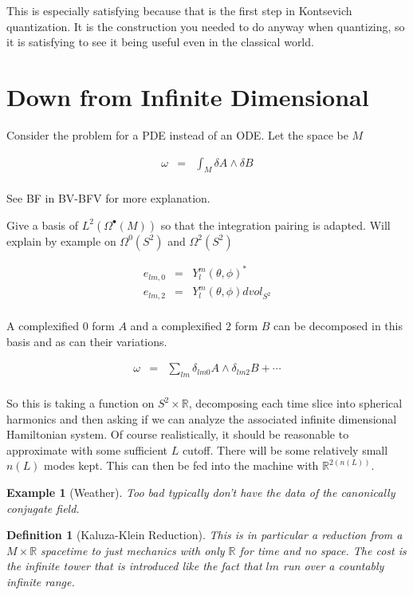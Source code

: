 \documentclass[a4paper,landscape]{article}
\theoremstyle{change}
\newtheorem{definition}[equation]{Definition}
\newtheorem{example}[equation]{Example}
\theoremstyle{nonumberplain}
\numberwithin{equation}{section}
\begin{document}
This is especially satisfying because that is the first step in Kontsevich quantization. It is the construction you needed to do anyway when quantizing, so it is satisfying to see it being useful even in the classical world.

\section{Down from Infinite Dimensional}

Consider the problem for a PDE instead of an ODE. Let the space be $M$

\begin{eqnarray*}
\omega &=& \int_M \delta A \wedge \delta B\\
\end{eqnarray*}

See BF in BV-BFV for more explanation.

Give a basis of $L^2 ( \Omega^\bullet (M))$ so that the integration pairing is adapted. Will explain by example on $\Omega^0 (S^2)$ and $\Omega^2 (S^2)$

\begin{eqnarray*}
e_{lm,0} &=& Y_l^m (\theta , \phi)^*\\
e_{lm,2} &=& Y_l^m (\theta , \phi) dvol_{S^2}\\
\end{eqnarray*}

A complexified $0$ form $A$ and a complexified $2$ form $B$ can be decomposed in this basis and as can their variations.

\begin{eqnarray*}
\omega &=& \sum_{lm} \delta_{lm0} A \wedge \delta_{lm2} B + \cdots\\
\end{eqnarray*}

So this is taking a function on $S^2 \times \mathbb{R}$, decomposing each time slice into spherical harmonics and then asking if we can analyze the associated infinite dimensional Hamiltonian system. Of course realistically, it should be reasonable to approximate with some sufficient $L$ cutoff. There will be some relatively small $n(L)$ modes kept. This can then be fed into the machine with $\mathbb{R}^{2(n(L))}$.

\begin{example}[Weather]
Too bad typically don't have the data of the canonically conjugate field.
\end{example}

\begin{definition}[Kaluza-Klein Reduction]
This is in particular a reduction from a $M \times \mathbb{R}$ spacetime to just mechanics with only $\mathbb{R}$ for time and no space. The cost is the infinite tower that is introduced like the fact that $lm$ run over a countably infinite range.
\end{definition}
\end{document}
